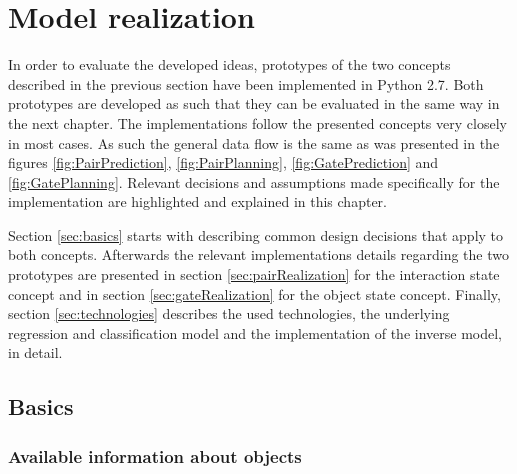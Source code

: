 \chapter{Model realization\label{chap:modelReal}}




In order to evaluate the developed ideas, prototypes of the two concepts described in the previous section have been implemented in Python 2.7. Both prototypes are developed as such that they can be evaluated in the same way in the next chapter. The implementations follow the presented concepts very closely in most cases. As such the general data flow is the same as was presented in the figures  \ref{fig:PairPrediction}, \ref{fig:PairPlanning}, \ref{fig:GatePrediction} and \ref{fig:GatePlanning}.
Relevant decisions and assumptions made specifically for the implementation are highlighted and explained in this chapter. %

Section \ref{sec:basics} starts with describing common design decisions that apply to both concepts. Afterwards the relevant implementations details regarding the two prototypes are presented in section \ref{sec:pairRealization} for the interaction state concept and in section \ref{sec:gateRealization} for the object state concept. Finally, section \ref{sec:technologies} describes the used technologies, the underlying regression and classification model and the implementation of the inverse model, in detail.

\section{Basics \label{sec:basics}}


\subsection{Available information about objects}

